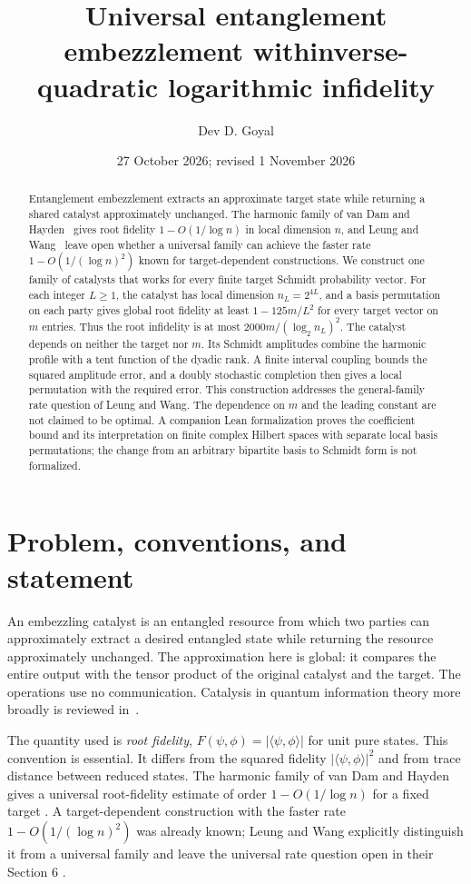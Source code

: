 \documentclass[11pt]{article}
\title{Universal entanglement embezzlement with\newline inverse-quadratic logarithmic infidelity}
\author{Dev D. Goyal}
\date{27 October 2026; revised 1 November 2026}
\begin{document}
\maketitle

\begin{abstract}
Entanglement embezzlement extracts an approximate target state while returning a shared catalyst approximately unchanged. The harmonic family of van Dam and Hayden~\cite{vdh} gives root fidelity $1-O(1/\log n)$ in local dimension $n$, and Leung and Wang~\cite{lw} leave open whether a universal family can achieve the faster rate $1-O(1/(\log n)^2)$ known for target-dependent constructions. We construct one family of catalysts that works for every finite target Schmidt probability vector. For each integer $L\geq1$, the catalyst has local dimension $n_L=2^{4L}$, and a basis permutation on each party gives global root fidelity at least $1-125m/L^2$ for every target vector on $m$ entries. Thus the root infidelity is at most $2000m/(\log_2 n_L)^2$. The catalyst depends on neither the target nor $m$. Its Schmidt amplitudes combine the harmonic profile with a tent function of the dyadic rank. A finite interval coupling bounds the squared amplitude error, and a doubly stochastic completion then gives a local permutation with the required error. This construction addresses the general-family rate question of Leung and Wang. The dependence on $m$ and the leading constant are not claimed to be optimal. A companion Lean formalization proves the coefficient bound and its interpretation on finite complex Hilbert spaces with separate local basis permutations; the change from an arbitrary bipartite basis to Schmidt form is not formalized.
\end{abstract}

\section{Problem, conventions, and statement}

An embezzling catalyst is an entangled resource from which two parties can approximately extract a desired entangled state while returning the resource approximately unchanged. The approximation here is global: it compares the entire output with the tensor product of the original catalyst and the target. The operations use no communication. Catalysis in quantum information theory more broadly is reviewed in~\cite{review}.

The quantity used is \emph{root fidelity}, $F(\psi,\phi)=|\langle\psi,\phi\rangle|$ for unit pure states. This convention is essential. It differs from the squared fidelity $|\langle\psi,\phi\rangle|^2$ and from trace distance between reduced states. The harmonic family of van Dam and Hayden gives a universal root-fidelity estimate of order $1-O(1/\log n)$ for a fixed target \cite{vdh}. A target-dependent construction with the faster rate $1-O(1/(\log n)^2)$ was already known; Leung and Wang explicitly distinguish it from a universal family and leave the universal rate question open in their Section 6 \cite{lw,ltw}.
\end{document}

